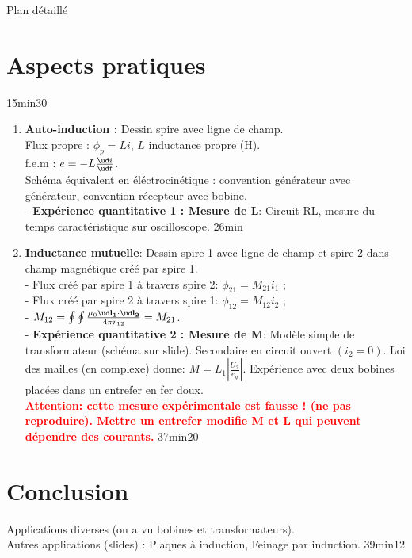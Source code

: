 \begin{reportBlock}{Plan détaillé}
\section{Aspects pratiques} 15min30
\begin{enumerate}
    \item \textbf{Auto-induction :} Dessin spire avec ligne de champ. \\
    Flux propre : $\phi_p = L i$, $L$ inductance propre (H). \\
    f.e.m : $e = - L \frac{\ud i}{\ud t}$. \\
    Schéma équivalent en éléctrocinétique : convention générateur avec générateur, convention récepteur avec bobine. \\
    - \textbf{Expérience quantitative 1 : Mesure de L}: Circuit RL, mesure du temps caractéristique sur oscilloscope.
    26min
    \item \textbf{Inductance mutuelle}: Dessin spire 1 avec ligne de champ et spire 2 dans champ magnétique créé par spire 1. \\
    - Flux créé par spire 1 à travers spire 2: $\phi_{21} = M_{21} i_1$ ; \\
    - Flux créé par spire 2 à travers spire 1: $\phi_{12} = M_{12} i_2$ ; \\
    - $M_{12} = \oint \oint \frac{\mu_0 \ud \mathbf{l_1} \cdot \ud \mathbf{l_2}}{4 \pi r_{12}} = M_{21}$. \\
     - \textbf{Expérience quantitative 2 : Mesure de M}: Modèle simple de transformateur (schéma sur slide). Secondaire en circuit ouvert $(i_2 = 0)$. Loi des mailles (en complexe) donne: $ M = L_1 \left| \frac{U_2}{e_g} \right|$. Expérience avec deux bobines placées dans un entrefer en fer doux. \\
     \textbf{\textcolor{red}{Attention: cette mesure expérimentale est fausse ! (ne pas reproduire). Mettre un entrefer modifie M et L qui peuvent dépendre des courants.}}
     \newline 37min20
\end{enumerate}

\vspace{1cm}
\section*{Conclusion} 
Applications diverses (on a vu bobines et transformateurs). \\
Autres applications (slides) : Plaques à induction, Feinage par induction.\newline
39min12
\end{reportBlock}


